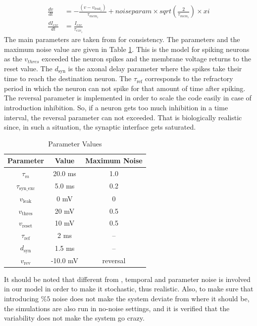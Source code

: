 \documentclass[letterpaper,12pt]{article}
\begin{document}
\begin{equation}
    \begin{split}
        \frac{dv}{dt} & = -\frac{(v - v_{leak_i})}{\tau_{mem_i}}+ noiseparam \times sqrt(\frac{2}{\tau_{mem_i}}) \times xi \\
        \frac{dI_{exc}}{dt} & = \frac{I_{exc}}{\tau_{exc_i}}
    \end{split}
    \label{diff_eqn}
\end{equation}
The main parameters are taken from \cite{brunel} for consistency. The parameters and the maximum noise value are given in Table \ref{parameterset}. This is the model for spiking neurons as the $v_{thres}$ exceeded the neuron spikes and the membrane voltage returns to the reset value. The $d_{\text{syn}}$ is the axonal delay parameter where the spikes take their time to reach the destination neuron. The $\tau_{\text{ref}}$ corresponds to the refractory period in which the neuron can not spike for that amount of time after spiking. The reversal parameter is implemented in order to scale the code easily in case of introduction inhibition. So, if a neuron gets too much inhibition in a time interval, the reversal parameter can not exceeded. That is biologically realistic since, in such a situation, the synaptic interface gets saturated.

\begin{table}[h]
    \centering
    \begin{tabular}{|c|c|c|}
    \hline
    Parameter & Value & Maximum Noise \\
    \hline
    $\tau_m$ & 20.0 ms & 1.0 \\
    $\tau_{\text{syn\_exc}}$ & 5.0 ms & 0.2 \\
    $v_{\text{leak}}$ & 0 mV & 0 \\
    $v_{\text{thres}}$ & 20 mV & 0.5 \\
    $v_{\text{reset}}$ & 10 mV & 0.5 \\
    $\tau_{\text{ref}}$ & 2 ms & -- \\
    $d_{\text{syn}}$ & 1.5 ms & -- \\
    $v_{\text{rev}}$ & -10.0 mV & reversal \\
    \hline
    \end{tabular}
    \caption{Parameter Values}
    \label{parameterset}
\end{table}
It should be noted that different from \cite{brunel}, temporal and parameter noise is involved in our model in order to make it stochastic, thus realistic. Also, to make sure that introducing $\% 5$ noise does not make the system deviate from where it should be, the simulations are also run in no-noise settings, and it is verified that the variability does not make the system go crazy.
\end{document}
